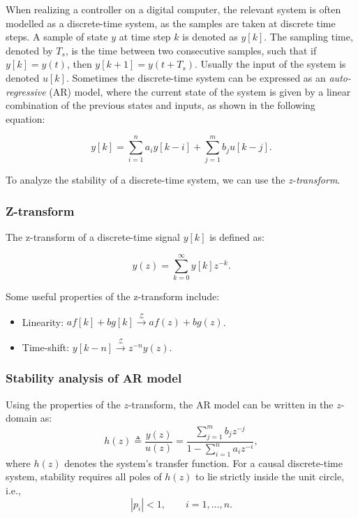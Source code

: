 When realizing a controller on a digital computer, the relevant system is often modelled as a discrete-time system, as the samples are taken at discrete time steps. A sample of state $y$ at time step $k$ is denoted as $y[k]$. The sampling time, denoted by $T_s$, is the time between two consecutive samples, such that if $y[k] = y(t)$, then $y[k+1] = y(t + T_s)$. Usually the input of the system is denoted $u[k]$. Sometimes the discrete-time system can be expressed as an \textit{auto-regressive} (AR) model, where the current state of the system is given by a linear combination of the previous states and inputs, as shown in the following equation:

\begin{equation}
    y[k] = \sum_{i=1}^{n} a_i y[k-i] + \sum_{j=1}^{m} b_j u[k-j].
\end{equation}

To analyze the stability of a discrete-time system, we can use the \textit{z-transform}. 

\subsubsection{Z-transform}
The z-transform of a discrete-time signal $y[k]$ is defined as:

\begin{equation}
    y(z) = \sum_{k=0}^{\infty} y[k] z^{-k}.
\end{equation}

Some useful properties of the z-transform include:

\begin{itemize}
    \item Linearity: $a f[k] + b g[k] \xrightarrow{\mathcal{Z}} a f(z) + b g(z)$.
    \item Time-shift: $y[k-n] \xrightarrow{\mathcal{Z}} z^{-n} y(z)$.
\end{itemize}

\subsubsection{Stability analysis of AR model}

Using the properties of the $z$-transform, the AR model can be written in the
$z$-domain as:
\begin{equation}
    h(z) \triangleq \frac{y(z)}{u(z)}
    =
    \frac{\sum_{j=1}^{m} b_j z^{-j}}
    {1 - \sum_{i=1}^{n} a_i z^{-i}},
\end{equation}
where $h(z)$ denotes the system's transfer function. For a causal discrete-time
system, stability requires all poles of $h(z)$ to lie strictly inside the unit
circle, i.e.,
\begin{equation}
    |p_i| < 1, \qquad i = 1,\dots,n.
\end{equation}

